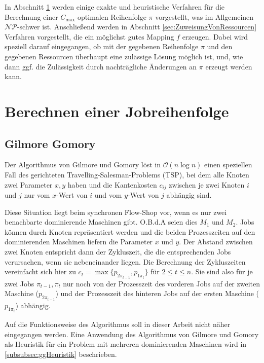 \documentclass{scrreprt}
\begin{document}
In Abschnitt \ref{sec:BerechnenEinerJobreihenfolge} werden einige exakte und heuristische Verfahren für die
Berechnung einer $C_{\max}$-optimalen Reihenfolge $\pi$ vorgestellt, was im Allgemeinen $\mathcal{NP}$-schwer ist.
Anschließend werden in Abschnitt \ref{sec:ZuweisungVonRessourcen} Verfahren vorgestellt, die ein möglichst gutes Mapping $f$ erzeugen.
Dabei wird speziell darauf eingegangen, ob mit der gegebenen Reihenfolge $\pi$ und den gegebenen Ressourcen
überhaupt eine zulässige Lösung möglich ist, und, wie dann ggf. die Zulässigkeit durch nachträgliche Änderungen an $\pi$
erzeugt werden kann.

\section{Berechnen einer Jobreihenfolge}
\label{sec:BerechnenEinerJobreihenfolge}
\subsection{Gilmore Gomory}
Der Algorithmus von Gilmore und Gomory \cite{...} löst in $\mathcal{O}(n\log n)$ einen speziellen Fall des gerichteten Travelling-Salesman-Problems (TSP),
bei dem alle Knoten zwei Parameter $x,y$ haben und die Kantenkosten $c_{ij}$ zwischen je zwei Knoten $i$ und $j$ nur vom $x$-Wert von $i$
und vom $y$-Wert von $j$ abhängig sind.

Diese Situation liegt beim synchronen Flow-Shop vor, wenn es nur zwei benachbarte dominierende Maschinen gibt.
O.B.d.A seien dies $M_1$ und $M_2$.
Jobs können durch Knoten repräsentiert werden und die beiden Prozesszeiten auf den dominierenden Maschinen liefern die Parameter $x$ und $y$. 
Der Abstand zwischen zwei Knoten entspricht dann der Zykluszeit, die die entsprechenden Jobs verursachen, wenn sie nebeneinander liegen.
Die Berechnung der Zykluszeiten vereinfacht sich hier zu
$c_t = \max \{p_{2\pi_{t-1}},p_{1\pi_t}\}$ für $2\leq t\leq n$.
Sie sind also für je zwei Jobs $\pi_{t-1},\pi_{t}$ nur noch von der Prozesszeit des vorderen Jobs auf der zweiten Maschine ($p_{2\pi_{t-1}}$) 
und der Prozesszeit des hinteren Jobs auf der ersten Maschine ($p_{1\pi_t}$) abhängig.

Auf die Funktionsweise des Algorithmus soll in dieser Arbeit nicht näher eingegangen werden.
Eine Anwendung des Algorithmus von Gilmore und Gomory als Heuristik für ein Problem mit mehreren dominierenden Maschinen wird in
\ref{subsubsec:ggHeuristik} beschrieben.
\end{document}
